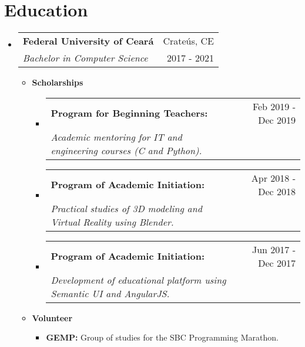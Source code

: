 \documentclass[letterpaper,11pt]{article}
\makeatletter
\newcommand{\resumeSubheading}[4]{
    \vspace{-1pt}\item
        \begin{tabular*}{0.97\textwidth}{l@{\extracolsep{\fill}}r}
            \textbf{#1} & #2 \\
            \textit{\small#3} & \small #4 \\
        \end{tabular*}
    \vspace{-5pt}
}
\newcommand{\resumeScholarship}[4]{
    \vspace{-1pt}\item
        \begin{tabular*}{0.89\textwidth}{l@{\extracolsep{\fill}}r}
            \textbf{#1} & #2 \\
            \textit{\small#3} & \small #4 \\
        \end{tabular*}\vspace{-5pt}
    \vspace{0.3cm}
}
\newcommand{\resumeSubHeadingListStart}{\begin{itemize}[leftmargin=*]}
\newcommand{\resumeSubHeadingListEnd}{\end{itemize}}
\makeatother
\begin{document}
\section{\faUniversity \hspace{0.2cm} Education}
    \resumeSubHeadingListStart
        \resumeSubheading
        {Federal University of Ceará}{\faMapMarker \hspace{0.1cm} Crateús, CE}
        {Bachelor in Computer Science}{\faCalendar \hspace{0.1cm} 2017 - 2021}
        \begin{itemize}
            \item \textbf{Scholarships}
                \begin{itemize}
                    \resumeScholarship
                    {Program for Beginning Teachers:}{\faCalendar \hspace{0.1cm} \small Feb 2019 - Dec 2019}
                    {Academic mentoring for IT and engineering courses (C and Python).}{}
            
                    \resumeScholarship
                    {Program of Academic Initiation:}{\faCalendar \hspace{0.1cm} \small Apr 2018 - Dec 2018}
                    {Practical studies of 3D modeling and Virtual Reality using Blender.}{}
        
                    \resumeScholarship
                    {Program of Academic Initiation:}{\faCalendar \hspace{0.1cm} \small Jun 2017 - Dec 2017}
                    {Development of educational platform using Semantic UI and AngularJS.}{}
                \end{itemize}
        \end{itemize}
      
        \begin{itemize}
            \item \textbf{Volunteer}
                \begin{itemize}
                    \item \textbf{GEMP:} Group of studies for the SBC Programming Marathon. \href{https://github.com/GEMP-UFC-Crateus}{\faInfoCircle}
                \end{itemize}
        \end{itemize}
        
        \vspace{0.1cm}
    \resumeSubHeadingListEnd
  
\end{document}
